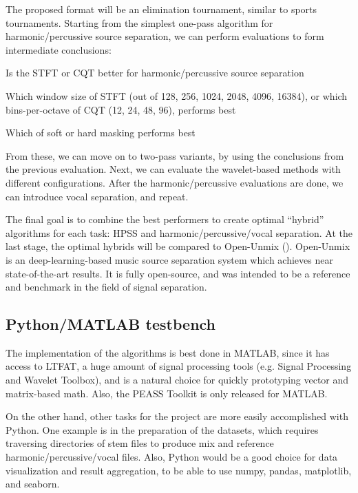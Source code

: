 \documentclass[10pt,letter]{article}
\newenvironment{tight_itemize}{
\begin{itemize}
\setlength{\itemsep}{0pt}
\setlength{\parskip}{0pt}
}{\end{itemize}}
\begin{document}
The proposed format will be an elimination tournament, similar to sports tournaments. Starting from the simplest one-pass algorithm for harmonic/percussive source separation, we can perform evaluations to form intermediate conclusions:

\begin{tight_itemize}
\vspace{-0.5em}
\item
	Is the STFT or CQT better for harmonic/percussive source separation
\item
	Which window size of STFT (out of 128, 256, 1024, 2048, 4096, 16384), or which bins-per-octave of CQT (12, 24, 48, 96), performs best
\item
	Which of soft or hard masking performs best
\end{tight_itemize} 

From these, we can move on to two-pass variants, by using the conclusions from the previous evaluation. Next, we can evaluate the wavelet-based methods with different configurations. After the harmonic/percussive evaluations are done, we can introduce vocal separation, and repeat.

The final goal is to combine the best performers to create optimal ``hybrid'' algorithms for each task: HPSS and harmonic/percussive/vocal separation. At the last stage, the optimal hybrids will be compared to Open-Unmix (\cite{umx}). Open-Unmix is an deep-learning-based music source separation system which achieves near state-of-the-art results. It is fully open-source, and was intended to be a reference and benchmark in the field of signal separation.

\subsection{Python/MATLAB testbench}

The implementation of the algorithms is best done in MATLAB, since it has access to LTFAT, a huge amount of signal processing tools (e.g. Signal Processing and Wavelet Toolbox), and is a natural choice for quickly prototyping vector and matrix-based math. Also, the PEASS Toolkit is only released for MATLAB.

On the other hand, other tasks for the project are more easily accomplished with Python. One example is in the preparation of the datasets, which requires traversing directories of stem files to produce mix and reference harmonic/percussive/vocal files. Also, Python would be a good choice for data visualization and result aggregation, to be able to use numpy\cite{numpy}, pandas\cite{pandas}, matplotlib\cite{matplotlib}, and seaborn\cite{seaborn}.
\end{document}
